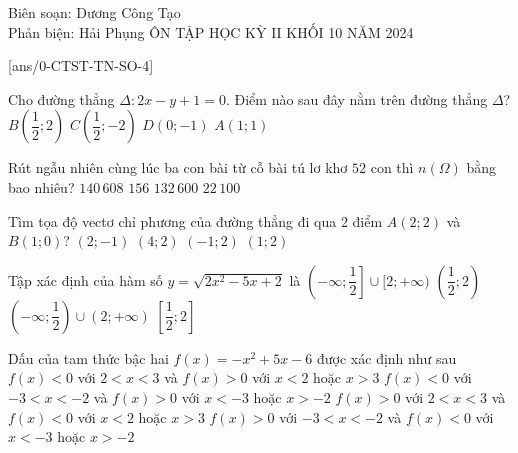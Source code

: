 
\setcounter{demsode}{4} %

\begin{name}
	{Biên soạn: Dương Công Tạo\\
	Phản biện: Hải Phụng}
	{ÔN TẬP HỌC KỲ II KHỐI 10 NĂM 2024}
\end{name}

\cautn
{}[ans/0-CTST-TN-SO-4]
\setcounter{ex}{0}
\begin{ex}%
	Cho đường thẳng $\Delta\colon 2x-y+1=0$. Điểm nào sau đây nằm trên đường thẳng $\Delta$?
	\choice
	{\True $B\left(\dfrac{1}{2};2\right)$}
	{$C\left(\dfrac{1}{2};-2\right)$}
	{$D(0;-1)$}
	{$A(1;1)$}
	\loigiai{
		
	}
\end{ex}

\begin{ex}%
	Rút ngẫu nhiên cùng lúc ba con bài từ cỗ bài tú lơ khơ $52$ con thì $n(\Omega)$ bằng bao nhiêu?
	\choice
	{$140\,608$}
	{$156$}
	{$132\,600$}
	{\True $22\,100$}
	\loigiai{
		
	}
\end{ex}

\begin{ex}%
	Tìm tọa độ vectơ chỉ phương của đường thẳng đi qua $2$ điểm $A(2; 2)$ và $B(1; 0)$?
	\choice
	{$(2;-1)$}
	{$(4; 2)$}
	{$(-1; 2)$}
	{\True $(1;2)$}
	\loigiai{
		
	}
\end{ex}

\begin{ex}%
	Tập xác định của hàm số $y=\sqrt{2x^2-5x+2}$ là
	\choice
	{\True $\left(-\infty; \dfrac{1}{2}\right] \cup[2;+\infty)$}
	{$\left(\dfrac{1}{2}; 2\right)$}
	{$\left(-\infty; \dfrac{1}{2}\right) \cup(2;+\infty)$}
	{$\left[\dfrac{1}{2}; 2\right]$}
	\loigiai{
	
	}
\end{ex}

\begin{ex}%
	Dấu của tam thức bậc hai $f(x)=-x^2+5x-6$ được xác định như sau
	\choice
	{$f(x) < 0$ với $2< x < 3$ và $f(x) > 0$ với $x < 2$ hoặc $x > 3$}
	{$f(x) < 0$ với $-3< x <-2$ và $f(x) > 0$ với $x <-3$ hoặc $x >-2$}
	{\True $f(x) > 0$ với $2< x < 3$ và $f(x) < 0$ với $x < 2$ hoặc $x > 3$}
	{$f(x) > 0$ với $-3< x <-2$ và $f(x) < 0$ với $x <-3$ hoặc $x >-2$}
	\loigiai{
	
	}
\end{ex}

